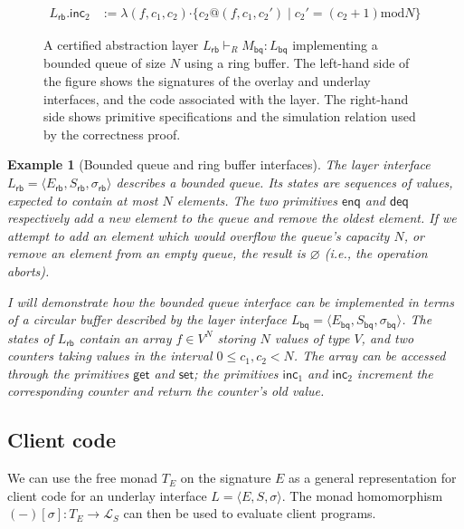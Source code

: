 \documentclass[11pt,oneside,draft]{book}
\newtheorem{example}[theorem]{Example}
\theoremstyle{definition}
\newcommand{\kw}[1]{\ensuremath{ \mathsf{#1} }}
\newcommand{\bdot}{\boldsymbol{\cdot}}
\begin{document}
\begin{figure}
\begin{align*}
        L_\kw{rb}.\kw{inc}_2 &:=
          \lambda (f, c_1, c_2) \bdot
          \{ c_2@(f, c_1, c_2') \mid
             c_2' = (c_2 + 1) \mathbin{\mathrm{mod}} N \}
    \end{align*}
  \caption[Certified abstraction layer implementing a bounded queue]%
   {A certified abstraction layer
    $L_\kw{rb} \vdash_R M_\kw{bq} : L_\kw{bq}$
    implementing a bounded queue of size $N$
    using a ring buffer.
    The left-hand side of the figure shows
    the signatures of the overlay and underlay interfaces,
    and the code associated with the layer.
    The right-hand side shows primitive specifications
    and the simulation relation used by the correctness proof.}
  \label{fig:cal}
\end{figure}

\begin{example}[Bounded queue and ring buffer interfaces] %
The layer interface
$L_\kw{rb} = \langle E_\kw{rb}, S_\kw{rb}, \sigma_\kw{rb} \rangle$
describes a bounded queue.
Its states are sequences of values,
expected to contain at most $N$ elements.
The two primitives
$\kw{enq}$ and $\kw{deq}$
respectively add a new element to the queue
and remove the oldest element.
If we attempt to add an element
which would overflow the queue's capacity $N$,
or remove an element from an empty queue,
the result is $\varnothing$ (i.e., the operation aborts).

I will demonstrate how the bounded queue interface
can be implemented in terms of a circular buffer
described by the layer interface
$L_\kw{bq} = \langle E_\kw{bq}, S_\kw{bq}, \sigma_\kw{bq} \rangle$.
The states of $L_\kw{rb}$
contain an array $f \in V^N$
storing $N$ values of type $V$,
and two counters
taking values in the interval $0 \le c_1, c_2 < N$.
The array can be accessed through the primitives
$\kw{get}$ and $\kw{set}$;
the primitives $\kw{inc}_1$ and $\kw{inc}_2$
increment the corresponding counter
and return the counter's old value.
\end{example}


\subsection{Client code} \label{sec:cal:cli} %

We can use the free monad $T_E$ on the signature $E$
as a general representation for client code for
an underlay interface $L = \langle E, S, \sigma \rangle$.
The monad homomorphism $(-)[\sigma] : T_E \rightarrow \mathcal{L}_S$
can then be used to evaluate client programs.
\end{document}
